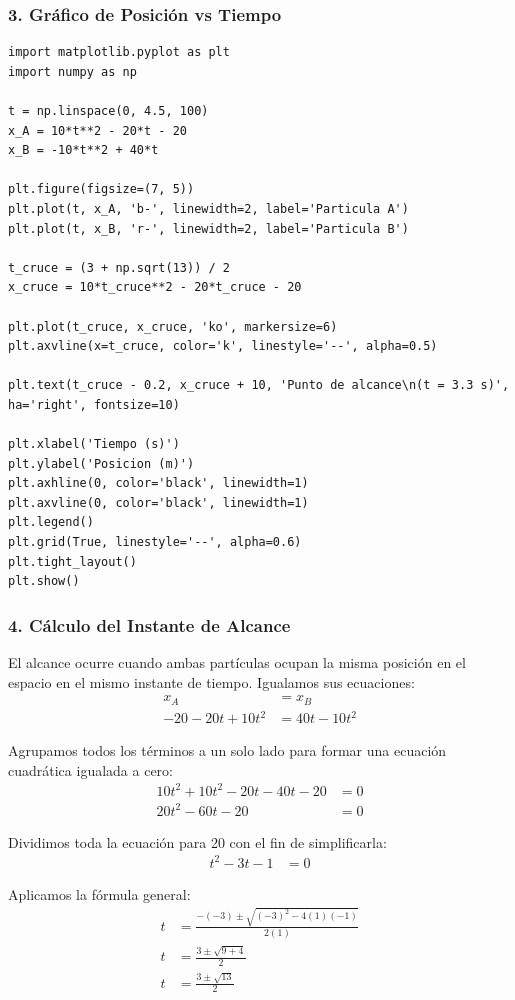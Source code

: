 \documentclass[12pt, a4paper]{article}
\begin{document}
\subsubsection*{3. Gráfico de Posición vs Tiempo}

\begin{lstlisting}
import matplotlib.pyplot as plt
import numpy as np

t = np.linspace(0, 4.5, 100)
x_A = 10*t**2 - 20*t - 20
x_B = -10*t**2 + 40*t

plt.figure(figsize=(7, 5))
plt.plot(t, x_A, 'b-', linewidth=2, label='Particula A')
plt.plot(t, x_B, 'r-', linewidth=2, label='Particula B')

t_cruce = (3 + np.sqrt(13)) / 2
x_cruce = 10*t_cruce**2 - 20*t_cruce - 20

plt.plot(t_cruce, x_cruce, 'ko', markersize=6)
plt.axvline(x=t_cruce, color='k', linestyle='--', alpha=0.5)

plt.text(t_cruce - 0.2, x_cruce + 10, 'Punto de alcance\n(t = 3.3 s)', ha='right', fontsize=10)

plt.xlabel('Tiempo (s)')
plt.ylabel('Posicion (m)')
plt.axhline(0, color='black', linewidth=1)
plt.axvline(0, color='black', linewidth=1)
plt.legend()
plt.grid(True, linestyle='--', alpha=0.6)
plt.tight_layout()
plt.show()
\end{lstlisting}

\subsubsection*{4. Cálculo del Instante de Alcance}
El alcance ocurre cuando ambas partículas ocupan la misma posición en el espacio en el mismo instante de tiempo. Igualamos sus ecuaciones:
\begin{align*}
x_A &= x_B \\
-20 - 20t + 10t^2 &= 40t - 10t^2
\end{align*}

Agrupamos todos los términos a un solo lado para formar una ecuación cuadrática igualada a cero:
\begin{align*}
10t^2 + 10t^2 - 20t - 40t - 20 &= 0 \\
20t^2 - 60t - 20 &= 0
\end{align*}

Dividimos toda la ecuación para 20 con el fin de simplificarla:
\begin{align*}
t^2 - 3t - 1 &= 0
\end{align*}

Aplicamos la fórmula general:
\begin{align*}
t &= \frac{-(-3) \pm \sqrt{(-3)^2 - 4(1)(-1)}}{2(1)} \\
t &= \frac{3 \pm \sqrt{9 + 4}}{2} \\
t &= \frac{3 \pm \sqrt{13}}{2}
\end{align*}
\end{document}
